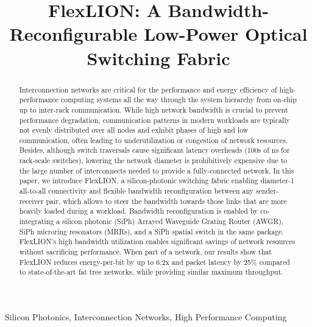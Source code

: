 \documentclass[journal]{IEEEtran}
\begin{document}
\title{FlexLION: A Bandwidth-Reconfigurable Low-Power Optical Switching Fabric}



\maketitle

\begin{abstract}
Interconnection networks are critical for the performance and energy efficiency of high-performance computing systems all the way through the system hierarchy from on-chip up to inter-rack communication. While high network bandwidth is crucial to prevent performance degradation, communication patterns in modern workloads are typically not evenly distributed over all nodes and exhibit phases of high and low communication, often leading to underutilization or congestion of network resources. Besides, although switch traversals cause significant latency overheads (100s of ns for rack-scale switches), lowering the network diameter is prohibitively expensive due to the large number of interconnects needed to provide a fully-connected network. In this paper, we introduce FlexLION, a silicon-photonic switching fabric enabling diameter-1 all-to-all connectivity and flexible bandwidth reconfiguration between any sender-receiver pair, which allows to steer the bandwidth towards those links that are more heavily loaded during a workload. Bandwidth reconfiguration is enabled by co-integrating a silicon photonic (SiPh) Arrayed Waveguide Grating Router (AWGR), SiPh microring resonators (MRRs), and a SiPh spatial switch in the same package. FlexLION's high bandwidth utilization enables significant savings of network resources without sacrificing performance. When part of a  network, our results show that FlexLION reduces energy-per-bit by up to 6.2x and packet latency by 25\% compared to state-of-the-art fat tree networks, while providing similar maximum throughput. 
\end{abstract}

\begin{IEEEkeywords}
Silicon Photonics, Interconnection Networks, High Performance Computing
\end{IEEEkeywords}






\end{document}
